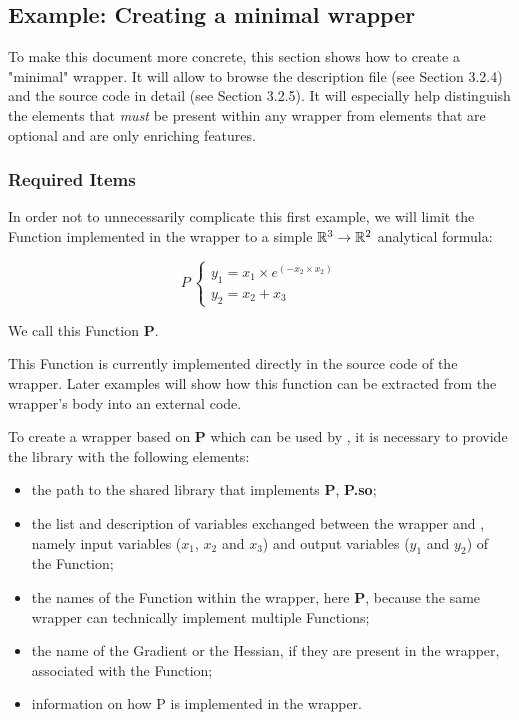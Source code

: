 \subsection{Example: Creating a minimal wrapper}

To make this document more concrete, this section shows how to create a "minimal" wrapper. It will allow to browse the description file (see Section 3.2.4) and the source code in detail (see Section 3.2.5). It will especially help distinguish the elements that \emph{must} be present within any wrapper from elements that are optional and are only enriching features.

\subsubsection{Required Items}

In order not to unnecessarily complicate this first example, we will limit the Function implemented in the wrapper to a simple $\mathbb{R}^{3} \to \mathbb{R}^{2}$ analytical formula:

$$P\:\left\{\begin{array}{l}
    y_1 = x_1 \times e^{(- x_2 \times x_2)} \\
    y_2 = x_2 + x_3
  \end{array}\right.$$

We call this Function {\bf P}.

This Function is currently implemented directly in the source code of the wrapper. Later examples will show how this function can be extracted from the wrapper's body into an external code.

To create a wrapper based on {\bf P} which can be used by \OT, it is necessary to provide the library with the following elements:
\begin{itemize}
\item the path to the shared library that implements {\bf P}, {\bf P.so};
\item the list and description of variables exchanged between the wrapper and \OT, namely input variables ($x_1$, $x_2$ and $x_3$) and output variables ($y_1$ and $y_2$) of the Function;
\item the names of the Function within the wrapper, here {\bf P}, because the same wrapper can technically implement multiple Functions;
\item the name of the Gradient or the Hessian, if they are present in the wrapper, associated with the Function;
\item information on how P is implemented in the wrapper.
\end{itemize}

